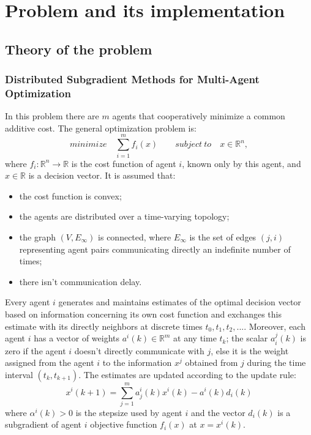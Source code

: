 \documentclass[a4paper,11pt,oneside]{book}
\begin{document}
\chapter{Problem and its implementation} \label{Cap1}

\section{Theory of the problem} \label{Sec1.1}
\subsection {Distributed Subgradient Methods for Multi-Agent Optimization} \label{Subsec1.1.1}
In this problem there are $m$ agents that cooperatively minimize a common additive cost. The general optimization problem is:\\
\begin{equation} \label{costfunct}
minimize \quad \sum\limits_{i=1}^{m} f_{i} \left( x \right) \qquad subject \ to \quad x \in \mathbb{R}^n,
\end{equation}
where $f_i : \mathbb{R}^n \longrightarrow \mathbb{R}$ is the cost function of agent $i$, known only by this agent, and $x \in \mathbb{R}$ is a decision vector. It is assumed that:
\begin{itemize} 
\item the cost function is convex;
\item the agents are distributed over a time-varying topology;
\item the graph $\left(V,E_\infty\right)$ is connected, where $E_\infty$ is the set of edges $\left(j,i\right)$ representing agent pairs communicating directly an indefinite number of times;
\item there isn't communication delay.
\end{itemize} 
Every agent $i$ generates and maintains estimates of the optimal decision vector based on information concerning its own cost function and exchanges this estimate with its directly neighbors at discrete times $t_0, t_1, t_2, ...$. Moreover, each agent $i$ has a vector of weights $a^i(k) \in \mathbb{R}^m$ at any time $t_k$; the scalar $a_i^j(k)$ is zero if the agent $i$ doesn't directly communicate with $j$, else it is the weight assigned from the agent $i$ to the information $x^j$ obtained from $j$ during the time interval $(t_k,t_{k+1})$. The estimates are updated according to the update rule:
\begin{equation} \label{update}
x^i\left(k+1\right) = \sum_{j=1}^{m}{a_j^i\left(k\right)x^i\left(k\right)-a^i\left(k\right)d_i\left(k\right)}
\end{equation}
where $\alpha^i(k)>0$ is the stepsize used by agent $i$ and the vector $d_i(k)$ is a subgradient of agent $i$ objective function $f_i(x)$ at $x=x^i(k)$. \cite{CITATION:1}
\end{document}
